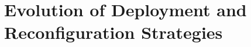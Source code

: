 \chapter{Evolution of Deployment and Reconfiguration Strategies}
\label{chap:evolution-of-deployment}
